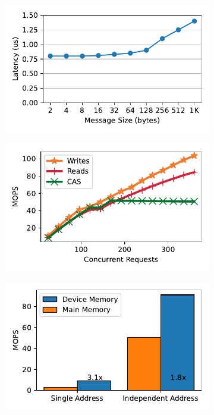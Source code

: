 \begin{figure}[t]
    \centering
    \newcommand{\subfigwidth}{0.32\linewidth}
    \begin{subfigure}{\subfigwidth}
        \includegraphics[width=0.99\linewidth]{fig/rdma_latency.pdf}
    \end{subfigure}
    \begin{subfigure}{\subfigwidth}
        \includegraphics[width=0.99\linewidth]{fig/rdma_concur.pdf}
    \end{subfigure}
    \begin{subfigure}{\subfigwidth}
        \includegraphics[width=0.99\linewidth]{fig/rdma_cas_throughput.pdf}

\end{subfigure}
\end{figure}
